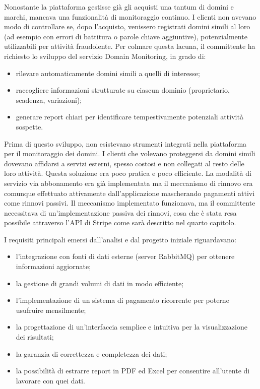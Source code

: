 \documentclass[target=bach,aauheader=,style=]{thud}
\begin{document}
Nonostante la piattaforma gestisse già gli acquisti una tantum di domini e marchi, mancava una funzionalità di monitoraggio continuo. I clienti non avevano modo di controllare se, dopo l'acquisto,
venissero registrati domini simili al loro (ad esempio con errori di battitura o parole chiave aggiuntive), potenzialmente utilizzabili per attività fraudolente. Per colmare questa lacuna,
il committente ha richiesto lo sviluppo del servizio Domain Monitoring, in grado di:
\begin{itemize}
    \item rilevare automaticamente domini simili a quelli di interesse;
    \item raccogliere informazioni strutturate su ciascun dominio (proprietario, scadenza, variazioni);
    \item generare report chiari per identificare tempestivamente potenziali attività sospette.
\end{itemize}

Prima di questo sviluppo, non esistevano strumenti integrati nella piattaforma per il monitoraggio dei domini. I clienti che volevano proteggersi da domini simili dovevano affidarsi a
servizi esterni, spesso costosi e non collegati al resto delle loro attività. Questa soluzione era poco pratica e poco efficiente.
La modalità di servizio via abbonamento era già implementata ma il meccanismo di rinnovo era comunque effettuato attivamente dall'applicazione mascherando pagamenti attivi come rinnovi passivi.
Il meccanismo implementato funzionava, ma il committente necessitava di un'implementazione passiva dei rinnovi, cosa che è stata resa possibile attraverso l'API di Stripe come sarà descritto nel quarto
capitolo.

I requisiti principali emersi dall'analisi e dal progetto iniziale riguardavano:
\begin{itemize}
\item l'integrazione con fonti di dati esterne (server RabbitMQ) per ottenere informazioni aggiornate;
\item la gestione di grandi volumi di dati in modo efficiente;
\item l'implementazione di un sistema di pagamento ricorrente per poterne usufruire mensilmente;
\item la progettazione di un'interfaccia semplice e intuitiva per la visualizzazione dei risultati;
\item la garanzia di correttezza e completezza dei dati;
\item la possibilità di estrarre report in PDF ed Excel per consentire all'utente di lavorare con quei dati.
\end{itemize}
\end{document}
